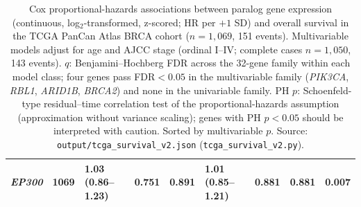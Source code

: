 \documentclass[11pt,a4paper]{article}
\begin{document}
\begin{table}[H]
\begin{tabular}{lrlllllll}
\textit{EP300} & 1069 & 1.03 (0.86--1.23) & 0.751 & 0.891 & 1.01 (0.85--1.21) & 0.881 & 0.881 & 0.007 \\
\bottomrule
\end{tabular}
\caption{Cox proportional-hazards associations between paralog gene expression (continuous, log$_2$-transformed, z-scored; HR per $+1$ SD) and overall survival in the TCGA PanCan Atlas BRCA cohort ($n=1{,}069$, 151 events). Multivariable models adjust for age and AJCC stage (ordinal I--IV; complete cases $n=1{,}050$, 143 events). $q$: Benjamini--Hochberg FDR across the 32-gene family within each model class; four genes pass FDR$<0.05$ in the multivariable family (\textit{PIK3CA}, \textit{RBL1}, \textit{ARID1B}, \textit{BRCA2}) and none in the univariable family. PH $p$: Schoenfeld-type residual--time correlation test of the proportional-hazards assumption (approximation without variance scaling); genes with PH $p<0.05$ should be interpreted with caution. Sorted by multivariable $p$. Source: \texttt{output/tcga\_survival\_v2.json} (\texttt{tcga\_survival\_v2.py}).}
\end{table}
\end{document}
